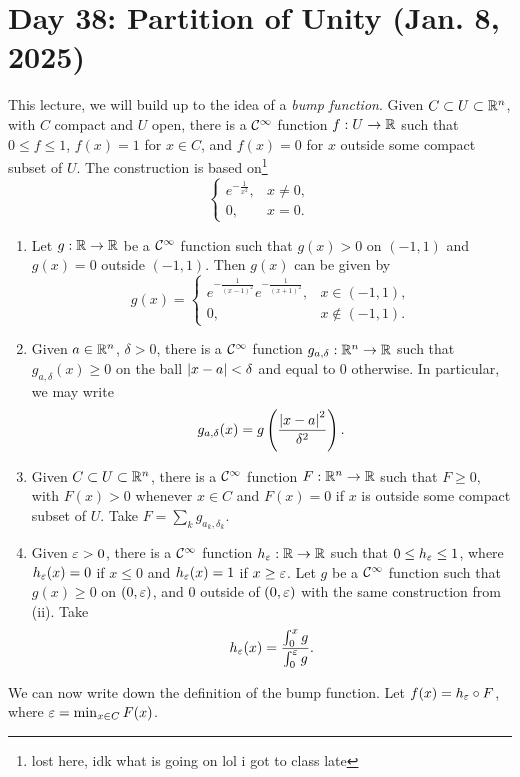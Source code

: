 \section{Day 38: Partition of Unity (Jan. 8, 2025)}
This lecture, we will build up to the idea of a \textit{bump function}. Given $C \subset U \subset \mathbb R^n$, with $C$ compact and $U$ open, there is a $\mathcal C^\infty$ function $f : U \to \mathbb R$ such that $0 \leq f \leq 1$, $f(x) = 1$ for $x \in C$, and $f(x) = 0$ for $x$ outside some compact subset of $U$. The construction is based on\footnote{lost here, idk what is going on lol i got to class late}
\[ \begin{cases} e^{-\frac{1}{x^2}} , &x \neq 0, \\ 0, &x = 0. \end{cases} \]
\begin{enumerate}[label=(\roman*)]
    \item Let $g : \mathbb R \to \mathbb R$ be a $\mathcal C^\infty$ function such that $g(x) > 0$ on $(-1, 1)$ and $g(x) = 0$ outside $(-1, 1)$. Then $g(x)$ can be given by
    \[ g(x) = \begin{cases} e^{-\frac{1}{(x-1)^2}} e^{-\frac{1}{(x+1)^2}}, &x \in (-1, 1), \\ 0, &x \not\in (-1, 1). \end{cases} \]
    \item Given $a \in \mathbb R^n$, $\delta > 0$, there is a $\mathcal C^\infty$ function $g_{a,\delta} : \mathbb R^n \to \mathbb R$  such that $g_{a,\delta}(x) \geq 0$ on the ball $\left\lvert x - a \right\rvert < \delta$ and equal to $0$ otherwise. In particular, we may write
    \[ g_{a,\delta}(x) = g\left(\frac{\left\lvert x - a \right\rvert^2}{\delta^2}\right). \]
    \item Given $C \subset U \subset \mathbb R^n$, there is a $\mathcal C^\infty$ function $F : \mathbb R^n \to \mathbb R$ such that $F \geq 0$, with $F(x) > 0$ whenever $x \in C$ and $F(x) = 0$ if $x$ is outside some compact subset of $U$. Take $F = \sum_{k} g_{a_k, \delta_k}$.
    \item Given $\varepsilon > 0$, there is a $\mathcal C^\infty$ function $h_\varepsilon : \mathbb R \to \mathbb R$ such that $0 \leq h_\varepsilon \leq 1$, where $h_\varepsilon(x) = 0$ if $x \leq 0$ and $h_\varepsilon(x) = 1$ if $x \geq \varepsilon$. Let $g$ be a $\mathcal C^\infty$ function such that $g(x) \geq 0$ on $(0, \varepsilon)$, and $0$ outside of $(0, \varepsilon)$ with the same construction from (ii). Take
    \[ h_\varepsilon(x) = \dfrac{\int_0^x g}{\int_0^\varepsilon g}. \]
\end{enumerate}
We can now write down the definition of the bump function. Let $f(x) = h_\varepsilon \circ F$, where $\varepsilon = \min_{x \in C} F(x)$.
